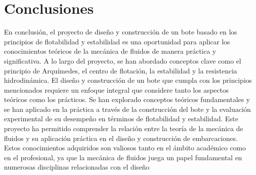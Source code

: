 \documentclass[letterpaper]{article}
\begin{document}
\section{Conclusiones}
En conclusión, el proyecto de diseño y construcción de un bote basado en los principios de flotabilidad y estabilidad es una oportunidad para aplicar los conocimientos teóricos de la mecánica de fluidos de manera práctica y significativa. A lo largo del proyecto, se han abordado conceptos clave como el principio de Arquímedes, el centro de flotación, la estabilidad y la resistencia hidrodinámica.
El diseño y construcción de un bote que cumpla con los principios mencionados requiere un enfoque integral que considere tanto los aspectos teóricos como los prácticos. Se han explorado conceptos teóricos fundamentales y se han aplicado en la práctica a través de la construcción del bote y la evaluación experimental de su desempeño en términos de flotabilidad y estabilidad.
Este proyecto ha permitido comprender la relación entre la teoría de la mecánica de fluidos y su aplicación práctica en el diseño y construcción de embarcaciones. Estos conocimientos adquiridos son valiosos tanto en el ámbito académico como en el profesional, ya que la mecánica de fluidos juega un papel fundamental en numerosas disciplinas relacionadas con el diseño


\newpage
\section*{}

\nocite{*}

\end{document}
